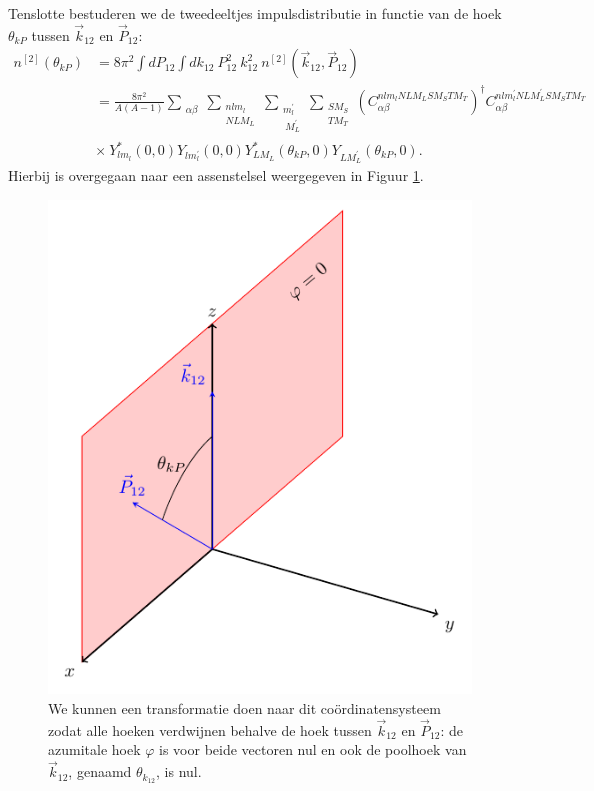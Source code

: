 \documentclass[11pt,twoside]{book}
\begin{document}
Tenslotte bestuderen we de tweedeeltjes impulsdistributie in functie van de hoek $\theta_{kP}$ tussen $\vec{k}_{12}$ en  $\vec{P}_{12}$:
\begin{align} \label{eq:angle_tb2}
n^{[2]}(\theta_{kP}) & = 8\pi^2 \int dP_{12} \int dk_{12}\  P_{12}^2\ k_{12}^2\ n^{[2]}(\vec{k}_{12},\vec{P}_{12}) \nonumber \\
& =   \frac{8\pi^2}{A(A-1)} \sum_{\substack{\alpha \beta }} \sum_{\substack{nlm_l \\ NLM_L}} \sum_{\substack{m_l^{\prime} \\\ M_L^{\prime} }} \sum_{\substack{S M_S \\T M_T}}  \left( C_{\alpha \beta}^{nlm_l NLM_L  S M_S T M_T} \right)^\dagger  C_{\alpha \beta}^{ n lm_l^{\prime} NLM_L^{\prime}  S M_S T M_T} \nonumber \\ & \times  \ Y^*_{l m_l}(0,0) Y_{l m_l^{\prime}}(0,0) Y^*_{L M_L}(\theta_{kP},0)  Y_{L M_L^{\prime}}(\theta_{kP},0). 
\end{align}
Hierbij is overgegaan naar een assenstelsel weergegeven in Figuur \ref{fig:assen}.
\begin{figure}[h]
\centering
\includegraphics[scale=0.85]{./figuren/assenstelsel1.pdf}
\caption{We kunnen een transformatie doen naar dit co\"{o}rdinatensysteem zodat alle hoeken verdwijnen behalve de hoek tussen $\vec{k}_{12}$ en $\vec{P}_{12}$: de azumitale hoek $\varphi$ is voor beide vectoren nul en ook de poolhoek van $\vec{k}_{12}$, genaamd $\theta_{k_{12}}$, is nul.  }
\label{fig:assen}
\end{figure}
\end{document}
